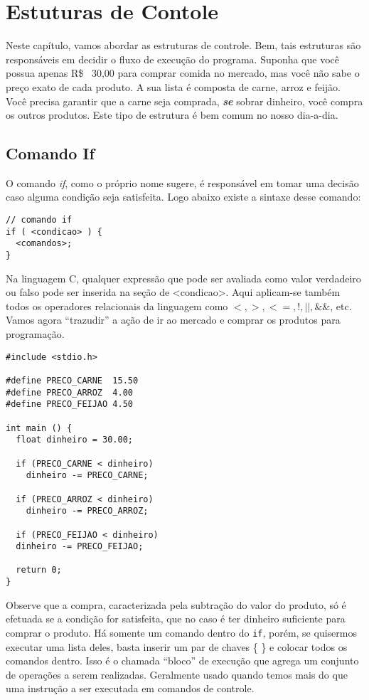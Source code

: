 
\chapter{Estuturas de Contole}

Neste capítulo, vamos abordar as estruturas de controle. Bem, tais estruturas são responsáveis em decidir o fluxo de execução do programa. Suponha que você possua apenas R\$ \ 30,00 para comprar comida no mercado, mas você não sabe o preço exato de cada produto. A sua lista é composta de carne, arroz e feijão. Você precisa garantir que a carne seja comprada, \emph{\textbf{se}} sobrar dinheiro, você compra os outros produtos. Este tipo de estrutura é bem comum no nosso dia-a-dia. 

\section{Comando If}
O comando \textit{if}, como o próprio nome sugere, é responsável em tomar uma decisão caso alguma condição seja satisfeita. Logo abaixo existe a sintaxe desse comando:


\begin{lstlisting}[label=comandoIf,caption=Comando if]
// comando if
if ( <condicao> ) {
  <comandos>;
}
\end{lstlisting}

Na linguagem C, qualquer expressão que pode ser avaliada como valor verdadeiro ou falso pode ser inserida na seção de <condicao>. Aqui aplicam-se também todos os operadores relacionais da linguagem como $<, >, <=, !, ||,  \&\&$, etc.
Vamos agora ``trazudir'' a ação de ir ao mercado e comprar os produtos para programação.


\begin{lstlisting}[label=comandoIf,caption=Comando if]
#include <stdio.h>

#define PRECO_CARNE  15.50
#define PRECO_ARROZ  4.00
#define PRECO_FEIJAO 4.50

int main () {
  float dinheiro = 30.00;
  
  if (PRECO_CARNE < dinheiro)
    dinheiro -= PRECO_CARNE;
  
  if (PRECO_ARROZ < dinheiro)
    dinheiro -= PRECO_ARROZ;
  
  if (PRECO_FEIJAO < dinheiro)
  dinheiro -= PRECO_FEIJAO;    
  
  return 0;
}
\end{lstlisting}

Observe que a compra, caracterizada pela subtração do valor do produto, só é efetuada se a condição for satisfeita, que no caso é ter dinheiro suficiente para comprar o produto.
Há somente um comando dentro do {\tt if}, porém, se quisermos executar uma lista deles, basta inserir um par de chaves \{ \} e colocar todos os comandos dentro. Isso é o chamada ``bloco'' de execução que agrega um conjunto de operações a serem realizadas. Geralmente usado quando temos mais do que uma instrução a ser executada em comandos de controle.

